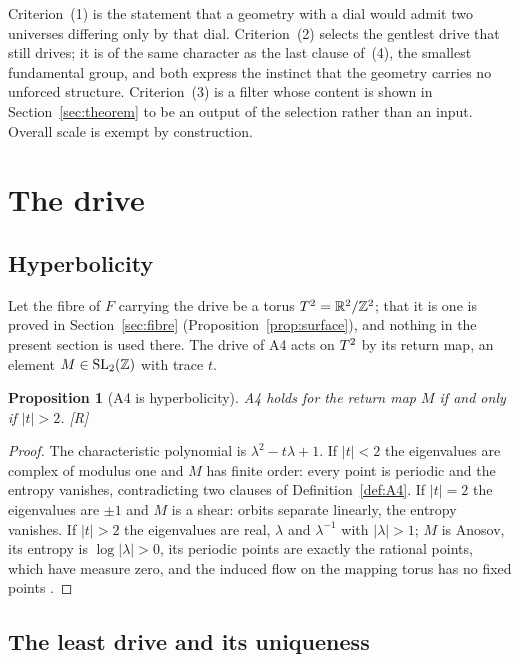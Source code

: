 \documentclass[11pt,a4paper]{article}
\theoremstyle{plain}
\newtheorem{proposition}[theorem]{Proposition}
\theoremstyle{definition}
\theoremstyle{remark}
\newcommand{\rigR}{[\textup{R}]}
\begin{document}
Criterion~(1) is the statement that a geometry with a dial would admit two universes differing only by that dial. Criterion~(2) selects the gentlest drive that still drives; it is of the same character as the last clause of~(4), the smallest fundamental group, and both express the instinct that the geometry carries no unforced structure. Criterion~(3) is a filter whose content is shown in Section~\ref{sec:theorem} to be an output of the selection rather than an input. Overall scale is exempt by construction.

\section{The drive}\label{sec:drive}

\subsection{Hyperbolicity}

Let the fibre of $F$ carrying the drive be a torus $T^2=\mathbb{R}^{2}/\mathbb{Z}^{2}$; that it is one is proved in Section~\ref{sec:fibre} (Proposition~\ref{prop:surface}), and nothing in the present section is used there. The drive of A4 acts on $T^2$ by its return map, an element $M\in\mathrm{SL}_{2}(\mathbb{Z})$ with trace $t$.

\begin{proposition}[A4 is hyperbolicity]\label{prop:hyp}
A4 holds for the return map $M$ if and only if $\lvert t\rvert>2$. \rigR
\end{proposition}

\begin{proof}
The characteristic polynomial is $\lambda^{2}-t\lambda+1$. If $\lvert t\rvert<2$ the eigenvalues are complex of modulus one and $M$ has finite order: every point is periodic and the entropy vanishes, contradicting two clauses of Definition~\ref{def:A4}. If $\lvert t\rvert=2$ the eigenvalues are $\pm1$ and $M$ is a shear: orbits separate linearly, the entropy vanishes. If $\lvert t\rvert>2$ the eigenvalues are real, $\lambda$ and $\lambda^{-1}$ with $\lvert\lambda\rvert>1$; $M$ is Anosov, its entropy is $\log\lvert\lambda\rvert>0$, its periodic points are exactly the rational points, which have measure zero, and the induced flow on the mapping torus has no fixed points \cite{KatokHasselblatt}.
\end{proof}

\subsection{The least drive and its uniqueness}
\end{document}
